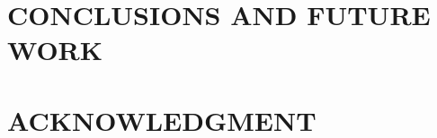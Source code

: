 \documentclass[letterpaper, 10 pt, conference]{ieeeconf}  %
\begin{document}

\section{CONCLUSIONS AND FUTURE WORK}







\section*{ACKNOWLEDGMENT}





\end{document}
